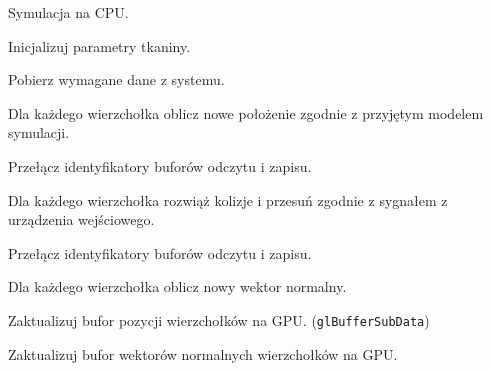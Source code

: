 		\newpage
		\begin{algorithm}[H]
			\label{alg_5_2}
			\caption{Symulacja na CPU.}	
			
			Inicjalizuj parametry tkaniny.
			
			{
				Pobierz wymagane dane z systemu.
				
				Dla każdego wierzchołka oblicz nowe położenie zgodnie z przyjętym modelem symulacji.
				
				Przełącz identyfikatory buforów odczytu i zapisu.
				
				Dla każdego wierzchołka rozwiąż kolizje i przesuń zgodnie z sygnałem z urządzenia wejściowego.
				
				Przełącz identyfikatory buforów odczytu i zapisu.
				
				Dla każdego wierzchołka oblicz nowy wektor normalny.
				
				Zaktualizuj bufor pozycji wierzchołków na GPU. (\texttt{glBufferSubData})
				
				Zaktualizuj bufor wektorów normalnych wierzchołków na GPU.
			}
			
		\end{algorithm}
		\newpage
